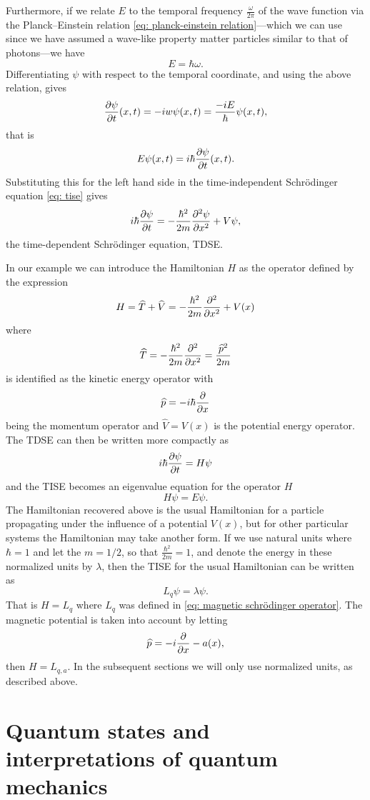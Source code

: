 Furthermore, if we relate $E$ to the temporal frequency $\frac{\omega}{2\pi}$ of the wave function via the Planck--Einstein relation \eqref{eq: planck-einstein relation}---which we can use since we have assumed a wave-like property matter particles similar to that of photons---we have
\[ E = \hbar \omega. \]
Differentiating $\psi$ with respect to the temporal coordinate, and using the above relation, gives
\[ \frac{\partial\psi}{\partial t}(x,t) = -iw\psi(x,t) = \frac{-iE}{\hbar} \psi(x,t), \]
that is
\begin{equation}
  E\psi(x,t) = i \hbar \frac{\partial\psi}{\partial t}(x,t).
\end{equation}
Substituting this for the left hand side in the time-independent Schrödinger equation \eqref{eq: tise} gives
\begin{equation}\label{eq: tdse}
  i \hbar \frac{\partial\psi}{\partial t} = -\frac{\hbar^2}{2m}\frac{\partial^2\psi}{\partial x^2} + V\psi,
\end{equation}
the time-dependent Schrödinger equation, TDSE.

In our example we can introduce the Hamiltonian $H$ as the operator defined by the expression
\[ H = \widehat{T} + \widehat{V} = -\frac{\hbar^2}{2m}\frac{\partial^2}{\partial x^2} + V(x) \]
where
\[ \widehat{T} = -\frac{\hbar^2}{2m}\frac{\partial^2}{\partial x^2} = \frac{\widehat{p}^2}{2m} \]
is identified as the kinetic energy operator with
\[ \widehat{p} = -i \hbar \frac{\partial}{\partial x} \]
being the momentum operator and $\widehat{V} = V(x)$ is the potential energy operator. The TDSE can then be written more compactly as
\[ i\hbar \frac{\partial\psi}{\partial t} = H\psi \]
and the TISE becomes an eigenvalue equation for the operator $H$
\[ H\psi = E\psi. \]
The Hamiltonian recovered above is the usual Hamiltonian for a particle propagating under the influence of a potential $V(x)$, but for other particular systems the Hamiltonian may take another form.
If we use natural units where $\hbar=1$ and let the $m = 1/2$, so that $\frac{\hbar^2}{2m} = 1$, and denote the energy in these normalized units by $\lambda$, then the TISE for the usual Hamiltonian can be written as
\[ L_q\psi = \lambda\psi. \]
That is $H = L_q$ where $L_q$ was defined in \eqref{eq: magnetic schrödinger operator}. The magnetic potential is taken into account by letting
\[ \widehat{p} = -i \frac{\partial}{\partial x} - a(x), \]
then $H = L_{q,a}$. In the subsequent sections we will only use normalized units, as described above.



\section{Quantum states and interpretations of quantum mechanics}\label{sec: quantum states and interpretations of quantum mechanics}


